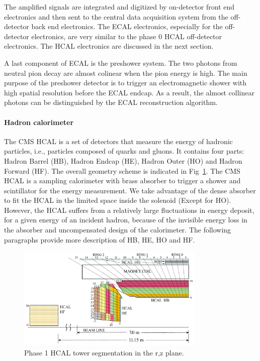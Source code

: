 The amplified signals are integrated and digitized by on-detector front end electronics and then sent to the central data acquisition system from the off-detector back end electronics. The ECAL electronics, especially for the off-detector electronics, are very similar to the phase 0 HCAL off-detector electronics. The HCAL electronics are discussed in the next section.

A last component of ECAL is the preshower system. The two photons from neutral pion decay are almost colinear when the pion energy is high. The main purpose of the preshower detector is to trigger an electromagnetic shower with high spatial resolution before the ECAL endcap. As a result, the almost collinear photons can be distinguished by the ECAL reconstruction algorithm. 

\paragraph{Hadron calorimeter}

The CMS HCAL is a set of detectors that measure the energy of hadronic particles, i.e., particles composed of quarks and gluons. It contains four parts: Hadron Barrel (HB), Hadron Endcap (HE), Hadron Outer (HO) and Hadron Forward (HF). The overall geometry scheme is indicated in Fig~\ref{fig:c3cms2dhcal}. The CMS HCAL is a sampling calorimeter with brass absorber to trigger a shower and scintillator for the energy measurement. We take advantage of the dense absorber to fit the HCAL in the limited space inside the solenoid (Except for HO). However, the HCAL suffers from a relatively large fluctuations in energy deposit, for a given energy of an incident hadron, because of the invisible energy loss in the absorber and uncompensated design of the calorimeter. The following paragraphs provide more description of HB, HE, HO and HF.

\begin{figure}[htbp]
 \begin{center}
  \includegraphics[width=0.8\textwidth]{figures/c3/c3_cms_2dhcal.pdf}
 \end{center}
 \caption{Phase 1 HCAL tower segmentation in the r,z plane.}
 \label{fig:c3cms2dhcal}
\end{figure}

